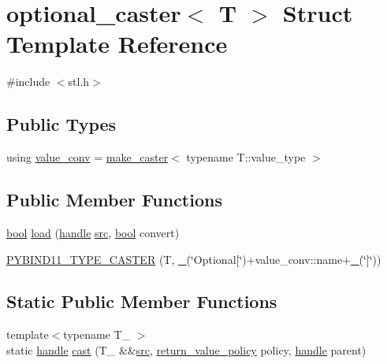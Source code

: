 \hypertarget{structoptional__caster}{}\section{optional\+\_\+caster$<$ T $>$ Struct Template Reference}
\label{structoptional__caster}


{\ttfamily \#include $<$stl.\+h$>$}

\subsection*{Public Types}
\begin{DoxyCompactItemize}
\item 
using \mbox{\hyperlink{structoptional__caster_a14811a7fbc6e8b1c68461474469979b1}{value\+\_\+conv}} = \mbox{\hyperlink{cast_8h_ab32b52411a6b07420516d79074815713}{make\+\_\+caster}}$<$ typename T\+::value\+\_\+type $>$
\end{DoxyCompactItemize}
\subsection*{Public Member Functions}
\begin{DoxyCompactItemize}
\item 
\mbox{\hyperlink{asdl_8h_af6a258d8f3ee5206d682d799316314b1}{bool}} \mbox{\hyperlink{structoptional__caster_aeac148e493d77cf9b1bfaedeb1bb60ca}{load}} (\mbox{\hyperlink{classhandle}{handle}} \mbox{\hyperlink{_s_d_l__opengl__glext_8h_a72e0fdf0f845ded60b1fada9e9195cd7}{src}}, \mbox{\hyperlink{asdl_8h_af6a258d8f3ee5206d682d799316314b1}{bool}} convert)
\item 
\mbox{\hyperlink{structoptional__caster_aebf055b93d355d31460d99fdd8f2e309}{P\+Y\+B\+I\+N\+D11\+\_\+\+T\+Y\+P\+E\+\_\+\+C\+A\+S\+T\+ER}} (T, \mbox{\hyperlink{descr_8h_af114703e20c6527e87163eb2798f74b8}{\+\_\+}}(\char`\"{}Optional\mbox{[}\char`\"{})+value\+\_\+conv\+::name+\mbox{\hyperlink{descr_8h_af114703e20c6527e87163eb2798f74b8}{\+\_\+}}(\char`\"{}\mbox{]}\char`\"{}))
\end{DoxyCompactItemize}
\subsection*{Static Public Member Functions}
\begin{DoxyCompactItemize}
\item 
{\footnotesize template$<$typename T\+\_\+ $>$ }\\static \mbox{\hyperlink{classhandle}{handle}} \mbox{\hyperlink{structoptional__caster_a6037ba36e2d38d203e038c341e74fa23}{cast}} (T\+\_\+ \&\&\mbox{\hyperlink{_s_d_l__opengl__glext_8h_a72e0fdf0f845ded60b1fada9e9195cd7}{src}}, \mbox{\hyperlink{detail_2common_8h_adde72ab1fb0dd4b48a5232c349a53841}{return\+\_\+value\+\_\+policy}} policy, \mbox{\hyperlink{classhandle}{handle}} parent)
\end{DoxyCompactItemize}


